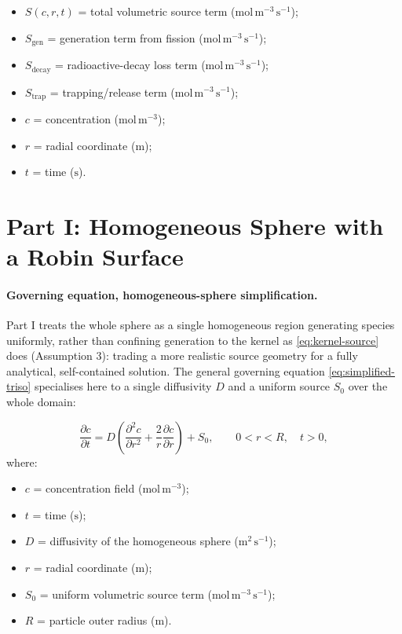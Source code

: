 \documentclass[11pt,a4paper]{article}
\begin{document}
\begin{itemize}[leftmargin=1.6em,itemsep=1pt,topsep=3pt,parsep=0pt]
  \item $S(c,r,t)$ = total volumetric source term ($\mathrm{mol\,m^{-3}\,s^{-1}}$);
  \item $S_{\text{gen}}$ = generation term from fission ($\mathrm{mol\,m^{-3}\,s^{-1}}$);
  \item $S_{\text{decay}}$ = radioactive-decay loss term ($\mathrm{mol\,m^{-3}\,s^{-1}}$);
  \item $S_{\text{trap}}$ = trapping/release term ($\mathrm{mol\,m^{-3}\,s^{-1}}$);
  \item $c$ = concentration ($\mathrm{mol\,m^{-3}}$);
  \item $r$ = radial coordinate ($\mathrm{m}$);
  \item $t$ = time ($\mathrm{s}$).
\end{itemize}





\section{Part I: Homogeneous Sphere with a Robin Surface}
\label{sec:part1}


\paragraph{Governing equation, homogeneous-sphere simplification.}
Part I treats the whole sphere as a single homogeneous region generating
species uniformly, rather than confining generation to the kernel as
\cref{eq:kernel-source} does (Assumption 3): trading a more realistic
source geometry for a fully analytical, self-contained solution. The
general governing equation \cref{eq:simplified-triso} specialises here to a
single diffusivity $D$ and a uniform source $S_0$ over the whole domain:

\begin{equation}
\frac{\partial c}{\partial t}
= D\left(\frac{\partial^2 c}{\partial r^2} + \frac{2}{r}\frac{\partial c}{\partial r}\right) + S_0,
\qquad 0 < r < R,\quad t > 0,
\label{eq:b:pde}
\end{equation}
\vspace{-0.3em}
\noindent where:

\begin{itemize}[leftmargin=1.6em,itemsep=1pt,topsep=3pt,parsep=0pt]
  \item $c$ = concentration field ($\mathrm{mol\,m^{-3}}$);
  \item $t$ = time ($\mathrm{s}$);
  \item $D$ = diffusivity of the homogeneous sphere ($\mathrm{m^{2}\,s^{-1}}$);
  \item $r$ = radial coordinate ($\mathrm{m}$);
  \item $S_0$ = uniform volumetric source term ($\mathrm{mol\,m^{-3}\,s^{-1}}$);
  \item $R$ = particle outer radius ($\mathrm{m}$).
\end{itemize}
\end{document}
